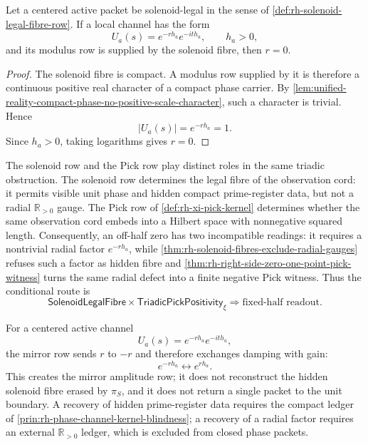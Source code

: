 \begin{theorem}
\label{thm:rh-solenoid-fibres-exclude-radial-gauges}
Let a centered active packet be solenoid-legal in the sense of
\autoref{def:rh-solenoid-legal-fibre-row}.  If a local channel has the
form
$$
U_a(s)=e^{-r h_a}e^{-it h_a},
\qquad
h_a>0,
$$
and its modulus row is supplied by the solenoid fibre, then $r=0$.
\end{theorem}

\begin{proof}
The solenoid fibre is compact.  A modulus row supplied by it is therefore
a continuous positive real character of a compact phase carrier.  By
\autoref{lem:unified-reality-compact-phase-no-positive-scale-character},
such a character is trivial.  Hence
$$
|U_a(s)|=e^{-r h_a}=1.
$$
Since $h_a>0$, taking logarithms gives $r=0$.
\end{proof}

\begin{principle}
\label{prin:rh-solenoid-pick-conditional-route}
The solenoid row and the Pick row play distinct roles in the same
triadic obstruction.  The solenoid row determines the legal fibre of the
observation cord: it permits visible unit phase and hidden compact
prime-register data, but not a radial $\mathbb R_{>0}$ gauge.  The Pick
row of \autoref{def:rh-xi-pick-kernel} determines whether the same
observation cord embeds into a Hilbert space with nonnegative squared
length.  Consequently, an off-half zero has two incompatible readings:
it requires a nontrivial radial factor $e^{-r h_a}$, while
\autoref{thm:rh-solenoid-fibres-exclude-radial-gauges} refuses such a
factor as hidden fibre and
\autoref{thm:rh-right-side-zero-one-point-pick-witness} turns the same
radial defect into a finite negative Pick witness.  Thus the conditional
route is
$$
\mathsf{SolenoidLegalFibre}
\times
\mathsf{TriadicPickPositivity}_{\xi}
\Longrightarrow
\text{fixed-half readout}.
$$
\end{principle}

\begin{principle}
\label{prin:rh-no-recovery-by-mirror-scale}
For a centered active channel
$$
U_a(s)=e^{-r h_a}e^{-it h_a},
$$
the mirror row sends $r$ to $-r$ and therefore exchanges damping with
gain:
$$
e^{-r h_a}
\longleftrightarrow
e^{r h_a}.
$$
This creates the mirror amplitude row; it does not reconstruct the
hidden solenoid fibre erased by $\pi_S$, and it does not return a single
packet to the unit boundary.  A recovery of hidden prime-register data
requires the compact ledger of
\autoref{prin:rh-phase-channel-kernel-blindness}; a recovery of a radial
factor requires an external $\mathbb R_{>0}$ ledger, which is excluded
from closed phase packets.
\end{principle}

